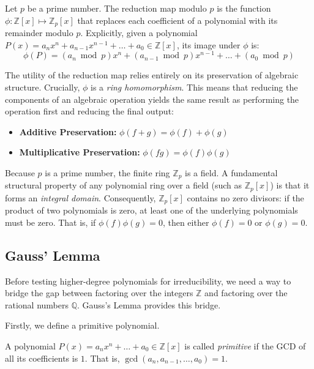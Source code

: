 \documentclass[11pt]{scrartcl}
\begin{document}
\begin{definition*}
Let $p$ be a prime number. The reduction map modulo $p$ is the function $\phi: \mathbb{Z}[x] \mapsto \mathbb{Z}_p[x]$ that replaces each coefficient of a polynomial with its remainder modulo $p$. Explicitly, given a polynomial $P(x) = a_n x^n + a_{n-1} x^{n-1} + \dots + a_0 \in \mathbb{Z}[x]$, its image under $\phi$ is:
\[ \phi(P) = (a_n \bmod p)x^n + (a_{n-1} \bmod p)x^{n-1} + \dots + (a_0 \bmod p) \]
\end{definition*}

The utility of the reduction map relies entirely on its preservation of algebraic structure. Crucially, $\phi$ is a \emph{ring homomorphism}. This means that reducing the components of an algebraic operation yields the same result as performing the operation first and reducing the final output:
\begin{itemize}
\item \textbf{Additive Preservation:} $\phi(f + g) = \phi(f) + \phi(g)$
\item \textbf{Multiplicative Preservation:} $\phi(fg) = \phi(f)\phi(g)$
\end{itemize}

Because $p$ is a prime number, the finite ring $\mathbb{Z}_p$ is a field. A fundamental structural property of any polynomial ring over a field (such as $\mathbb{Z}_p[x]$) is that it forms an \emph{integral domain}. Consequently, $\mathbb{Z}_p[x]$ contains no zero divisors: if the product of two polynomials is zero, at least one of the underlying polynomials must be zero. That is, if $\phi(f)\phi(g) = 0$, then either $\phi(f) = 0$ or $\phi(g) = 0$. 

\subsection{Gauss' Lemma}
Before testing higher-degree polynomials for irreducibility, we need a way to bridge the gap between factoring over the integers $\mathbb{Z}$ and factoring over the rational numbers $\mathbb{Q}$. Gauss's Lemma provides this bridge.

Firstly, we define a primitive polynomial.

\begin{definition*}
A polynomial $P(x) = a_n x^n + \dots + a_0 \in \mathbb{Z}[x]$ is called \emph{primitive} if the GCD of all its coefficients is $1$. That is, $\gcd(a_n, a_{n-1}, \dots, a_0) = 1$.
\end{definition*}
\end{document}
